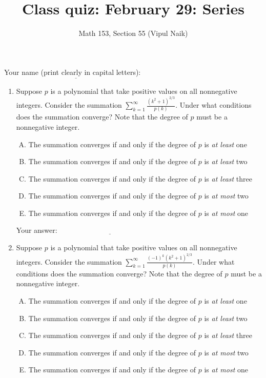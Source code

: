 \documentclass[10pt]{amsart}
\title{Class quiz: February 29: Series}
\author{Math 153, Section 55 (Vipul Naik)}
\begin{document}
\maketitle

Your name (print clearly in capital letters): $\underline{\qquad\qquad\qquad\qquad\qquad\qquad\qquad\qquad\qquad\qquad}$

\begin{enumerate}

\item Suppose $p$ is a polynomial that take positive values on all
  nonnegative integers. Consider the summation $\sum_{k=1}^\infty
  \frac{(k^2 + 1)^{2/3}}{p(k)}$. Under what conditions does the
  summation converge? Note that the degree of $p$ must be a
  nonnegative integer.

  \begin{enumerate}[(A)]
  \item The summation converges if and only if the degree of $p$ is
    {\em at least} one
  \item The summation converges if and only if the degree of $p$ is
    {\em at least} two
  \item The summation converges if and only if the degree of $p$ is
    {\em at least} three
  \item The summation converges if and only if the degree of $p$ is
    {\em at most} two
  \item The summation converges if and only if the degree of $p$ is
    {\em at most} one
  \end{enumerate}

  \vspace{0.1in}
  Your answer: $\underline{\qquad\qquad\qquad\qquad\qquad\qquad\qquad}$
  \vspace{0.15in}
\item Suppose $p$ is a polynomial that take positive values on all
  nonnegative integers. Consider the summation $\sum_{k=1}^\infty
  \frac{(-1)^k(k^2 + 1)^{2/3}}{p(k)}$. Under what conditions does the
  summation converge? Note that the degree of $p$ must be a
  nonnegative integer.

  \begin{enumerate}[(A)]
  \item The summation converges if and only if the degree of $p$ is
    {\em at least} one
  \item The summation converges if and only if the degree of $p$ is
    {\em at least} two
  \item The summation converges if and only if the degree of $p$ is
    {\em at least} three
  \item The summation converges if and only if the degree of $p$ is
    {\em at most} two
  \item The summation converges if and only if the degree of $p$ is
    {\em at most} one
  \end{enumerate}


\end{enumerate}
\end{document}
